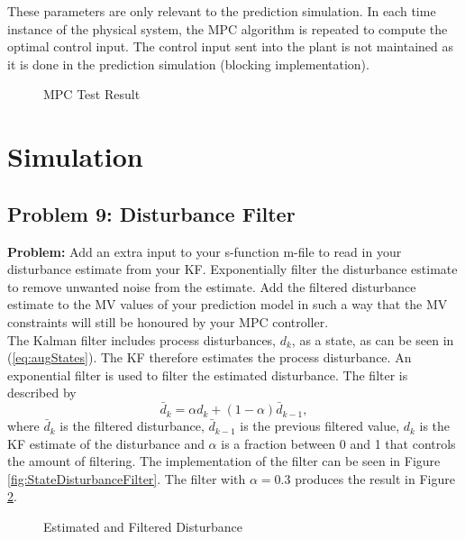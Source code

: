 \documentclass[12pt]{article}
\begin{document}
These parameters are only relevant to the prediction simulation. In each time instance of the physical system, the MPC algorithm is repeated to compute the optimal control input. The control input sent into the plant is not maintained as it is done in the prediction simulation (blocking implementation).

\begin{figure}[H]
	
	\centering
	\caption{MPC Test Result}
	\label{fig:TestMPC}
\end{figure}

\section{Simulation}

\subsection{Problem 9: Disturbance Filter}
\label{sec:DisturbanceFilter}

\textbf{Problem:} Add an extra input to your s-function m-file to read in your disturbance estimate from your KF. Exponentially filter the disturbance estimate to remove unwanted noise from the estimate. Add the filtered disturbance estimate to the MV values of your prediction model in such a way that the MV constraints will still be honoured by your MPC controller. \\

The Kalman filter includes process disturbances, $d_k$, as a state, as can be seen in (\ref{eq:augStates}). The KF therefore estimates the process disturbance. An exponential filter is used to filter the estimated disturbance. The filter is described by 
\begin{equation}
\bar{d}_k = \alpha d_k + (1-\alpha) \bar{d}_{k-1},
\end{equation}
where $ \bar{d}_k $ is the filtered disturbance, $ \bar{d}_{k-1} $ is the previous filtered value, $d_k$ is the KF estimate of the disturbance and $ \alpha $ is a fraction between 0 and 1 that controls the amount of filtering. The implementation of the filter can be seen in Figure \ref{fig:StateDisturbanceFilter}. The filter with $ \alpha = 0.3 $ produces the result in Figure \ref{fig:Disturbance}.

\begin{figure}[H]
	
	\centering
	\caption{Estimated and Filtered Disturbance}
	\label{fig:Disturbance}
\end{figure}
\end{document}
